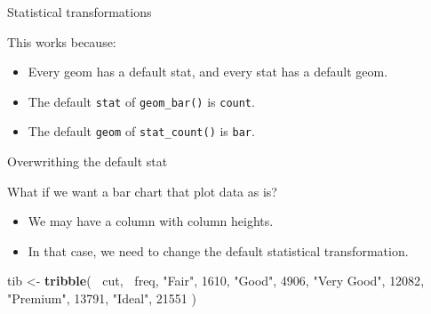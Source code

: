 \documentclass[ignorenonframetext,]{beamer}
\newenvironment{Shaded}{\begin{snugshade}}{\end{snugshade}}
\newcommand{\DecValTok}[1]{\textcolor[rgb]{0.00,0.00,0.81}{#1}}
\newcommand{\KeywordTok}[1]{\textcolor[rgb]{0.13,0.29,0.53}{\textbf{#1}}}
\newcommand{\NormalTok}[1]{#1}
\newcommand{\OperatorTok}[1]{\textcolor[rgb]{0.81,0.36,0.00}{\textbf{#1}}}
\newcommand{\StringTok}[1]{\textcolor[rgb]{0.31,0.60,0.02}{#1}}
\providecommand{\tightlist}{%
  \setlength{\itemsep}{0pt}\setlength{\parskip}{0pt}}
\begin{document}
\begin{frame}[fragile]{Statistical transformations}
\protect\hypertarget{statistical-transformations-6}{}

This works because:

\begin{itemize}
\item
  Every geom has a default stat, and every stat has a default geom.
\item
  The default \texttt{stat} of \texttt{geom\_bar()} is \texttt{count}.
\item
  The default \texttt{geom} of \texttt{stat\_count()} is \texttt{bar}.
\end{itemize}

\end{frame}

\begin{frame}[fragile]{Overwrithing the default stat}
\protect\hypertarget{overwrithing-the-default-stat}{}

What if we want a bar chart that plot data as is?

\begin{itemize}
\tightlist
\item
  We may have a column with column heights.
\item
  In that case, we need to change the default statistical
  transformation.
\end{itemize}

\begin{Shaded}
\begin{Highlighting}[]
\NormalTok{tib <-}\StringTok{ }\KeywordTok{tribble}\NormalTok{(}
  \OperatorTok{~}\NormalTok{cut,         }\OperatorTok{~}\NormalTok{freq,}
  \StringTok{"Fair"}\NormalTok{,       }\DecValTok{1610}\NormalTok{,}
  \StringTok{"Good"}\NormalTok{,       }\DecValTok{4906}\NormalTok{,}
  \StringTok{"Very Good"}\NormalTok{,  }\DecValTok{12082}\NormalTok{,}
  \StringTok{"Premium"}\NormalTok{,    }\DecValTok{13791}\NormalTok{,}
  \StringTok{"Ideal"}\NormalTok{,      }\DecValTok{21551}
\NormalTok{)}
\end{Highlighting}
\end{Shaded}

\end{frame}
\end{document}
